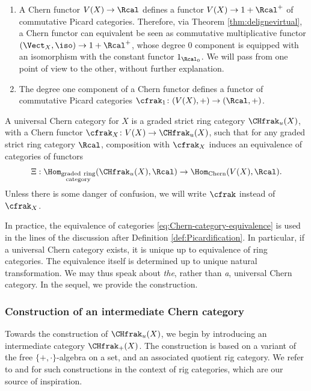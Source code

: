 \skpt
\begin{remark}\label{rmk:superficial-remarks-Chern-functors}
\begin{enumerate}
\item\label{rmk:supremChfun-1} A Chern functor $ V(X)\to\Rcal$ defines a functor $V(X)\to 1+\Rcal^{+}$ of commutative Picard categories. Therefore, via Theorem \ref{thm:delignevirtual}, a Chern functor can equivalent be seen as commutative multiplicative functor $(\Vect_{X},\iso)\to 1+\Rcal^{+}$, whose degree 0 component is equipped with an isomorphism with the constant functor $1_{\Rcal_{0}}$. We will pass from one point of view to the other, without further explanation.
\item\label{rmk:supremChfun-2} The degree one component of a Chern functor defines a functor of commutative Picard categories $\cfrak_{1}\colon (V(X),+)\to (\Rcal,+)$.
\end{enumerate}
\end{remark}

\begin{definition}\label{def:universal-chern-category}
A universal Chern category for $X$ is a graded strict ring category $\CHfrak_{u}(X)$, with a Chern functor $\cfrak_{X}\colon V(X)\to\CHfrak_{u}(X)$, such that for any graded strict ring category $\Rcal$, composition with $\cfrak_{X}$ induces an equivalence of categories of functors
\begin{equation}\label{eq:Chern-category-equivalence}
\Xi: \Hom_{\substack{\mathrm{graded\ ring}\\ \mathrm{category}}}(\CHfrak_{u}(X), \Rcal) \to \Hom_{\mathrm{Chern}}(V(X), \Rcal).
\end{equation}
Unless there is some danger of confusion, we will write $\cfrak$ instead of $\cfrak_{X}$.
\end{definition}

In practice, the equivalence of categories \eqref{eq:Chern-category-equivalence} is used in the lines of the discussion after Definition \ref{def:Picardification}. In particular, if a universal Chern category exists, it is unique up to equivalence of ring categories. The equivalence itself is determined up to unique natural transformation. We may thus speak about \emph{the}, rather than \emph{a}, universal Chern category. In the sequel, we provide the construction.

\subsubsection{Construction of an intermediate Chern category}\label{subsubsec:intermediate-category} Towards the construction of $\CHfrak_{u}(X)$, we begin by introducing an intermediate category $\CHfrak_{+}(X)$. The construction is based on a variant of the free $\lbrace +,\cdot\rbrace$-algebra on a set, and an associated quotient rig category. We refer to \cite[]{Laplaza} and \cite[Volume I, Chapter 3]{Johnson-Yau} for such constructions in the context of rig categories, which are our source of inspiration.

